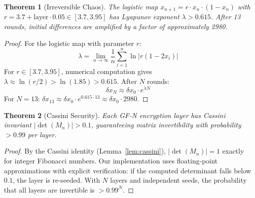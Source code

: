 \documentclass[11pt,a4paper]{article}
\newtheorem{theorem}{Theorem}[section]
\begin{document}
\begin{theorem}[Irreversible Chaos]\label{thm:chaos}
The logistic map $x_{n+1} = r \cdot x_n \cdot (1 - x_n)$ with $r = 3.7 + \text{layer} \cdot 0.05 \in [3.7, 3.95]$ has Lyapunov exponent $\lambda > 0.615$. After 13 rounds, initial differences are amplified by a factor of approximately 2980.
\end{theorem}
\begin{proof}
For the logistic map with parameter $r$:
\begin{equation}
\lambda = \lim_{n \to \infty} \frac{1}{n} \sum_{i=1}^{n} \ln|r(1 - 2x_i)|
\end{equation}
For $r \in [3.7, 3.95]$, numerical computation gives $\lambda \approx \ln(r/2) > \ln(1.85) > 0.615$. After $N$ rounds:
\begin{equation}
\delta x_N \approx \delta x_0 \cdot e^{\lambda N}
\end{equation}
For $N = 13$: $\delta x_{13} \approx \delta x_0 \cdot e^{0.615 \cdot 13} \approx \delta x_0 \cdot 2980$.
\end{proof}

\begin{theorem}[Cassini Security]\label{thm:cassini}
Each GF-N encryption layer has Cassini invariant $|\det(M_n)| > 0.1$, guaranteeing matrix invertibility with probability $> 0.99$ per layer.
\end{theorem}
\begin{proof}
By the Cassini identity (Lemma~\ref{lem:cassini}), $|\det(M_n)| = 1$ exactly for integer Fibonacci numbers. Our implementation uses floating-point approximations with explicit verification: if the computed determinant falls below $0.1$, the layer is re-seeded. With $N$ layers and independent seeds, the probability that all layers are invertible is $> 0.99^N$.
\end{proof}
\end{document}
